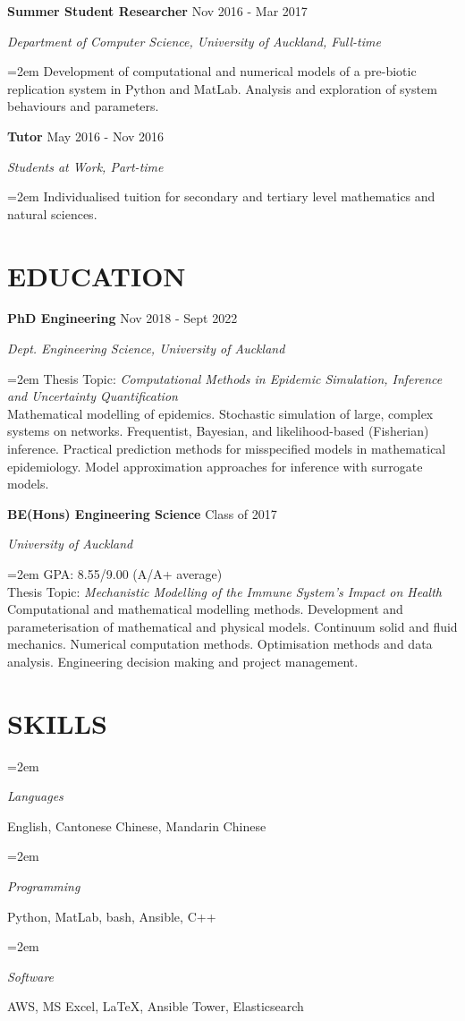\documentclass[paper=a4paper,fontsize=11pt]{scrartcl} %
\newlength{\spacebox}
\newcommand{\NewPart}[1]{\section*{\uppercase{#1}}}
\newcommand{\PersonalEntry}[2]{
		\noindent\hangindent=2em\hangafter=0 %
		\parbox{\spacebox}{        %
		\textit{#1}}		       %
		\hspace{1.5em} #2 \par}    %
\newcommand{\SkillsEntry}[2]{      %
		\noindent\hangindent=2em\hangafter=0 %
		\parbox{\spacebox}{        %
		\textit{#1}}			   %
		\hspace{1.5em} #2 \par}    %
\newcommand{\EducationEntry}[4]{
		\noindent \textbf{#1} \hfill      %
		{#2} \par  %
		\noindent \textit{#3} \par        %
		\noindent\hangindent=2em\hangafter=0 \small #4 %
		\normalsize \par\par}
\newcommand{\WorkEntry}[4]{				  %
		\noindent \textbf{#1} \hfill      %
		{#2} \par  %
		\noindent \textit{#3} \par              %
		\noindent\hangindent=2em\hangafter=0 \small #4 %
		\normalsize \par\par}
\begin{document}
\WorkEntry{Summer Student Researcher}{Nov 2016 - Mar 2017}{Department of Computer Science, University of Auckland, Full-time}{Development of computational and numerical models of a pre-biotic replication system in Python and MatLab. Analysis and exploration of system behaviours and parameters.}
\par

\WorkEntry{Tutor}{May 2016 - Nov 2016}{Students at Work, Part-time}{Individualised tuition for secondary and tertiary level mathematics and natural sciences.}

\NewPart{Education}

\EducationEntry{PhD Engineering}{Nov 2018 - Sept 2022}{Dept. Engineering Science, University of Auckland}{Thesis Topic: \textit{Computational Methods in Epidemic Simulation, Inference and Uncertainty Quantification}\\ Mathematical modelling of epidemics. Stochastic simulation of large, complex systems on networks. Frequentist, Bayesian, and likelihood-based (Fisherian) inference. Practical prediction methods for misspecified models in mathematical epidemiology. Model approximation approaches for inference with surrogate models.}

\EducationEntry{BE(Hons) Engineering Science}{Class of 2017}{University of Auckland}{GPA: 8.55/9.00 (A/A+ average)\\ Thesis Topic: \textit{Mechanistic Modelling of the Immune System's Impact on Health} \\ Computational and mathematical modelling methods. Development and parameterisation of mathematical and physical models. Continuum solid and fluid mechanics. Numerical computation methods. Optimisation methods and data analysis. Engineering decision making and project management.}


\NewPart{Skills}


\SkillsEntry{Languages}{English, Cantonese Chinese, Mandarin Chinese}

\SkillsEntry{Programming}{Python, MatLab, bash, Ansible, C++}

\SkillsEntry{Software}{AWS, MS Excel, \LaTeX, Ansible Tower, Elasticsearch}%
\end{document}
